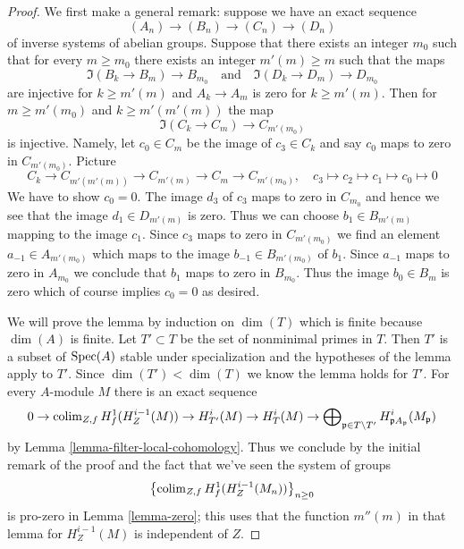 \begin{proof}
We first make a general remark: suppose we have an exact
sequence
$$
(A_n) \to (B_n) \to (C_n) \to (D_n)
$$
of inverse systems of abelian groups. Suppose that there exists
an integer $m_0$ such that for every $m \geq m_0$
there exists an integer $m'(m) \geq m$ such that the maps
$$
\Im(B_k \to B_m) \longrightarrow B_{m_0}
\quad\text{and}\quad
\Im(D_k \to D_m) \longrightarrow D_{m_0}
$$
are injective for $k \geq m'(m)$ and $A_k \to A_m$ is zero
for $k \geq m'(m)$. Then for $m \geq m'(m_0)$ and $k \geq m'(m'(m))$
the map
$$
\Im(C_k \to C_m) \to C_{m'(m_0)}
$$
is injective. Namely, let $c_0 \in C_m$ be the image of $c_3 \in C_k$
and say $c_0$ maps to zero in $C_{m'(m_0)}$. Picture
$$
C_k \to C_{m'(m'(m))} \to C_{m'(m)} \to C_m \to C_{m'(m_0)},\quad
c_3 \mapsto c_2 \mapsto c_1 \mapsto c_0 \mapsto 0
$$
We have to show $c_0 = 0$.
The image $d_3$ of $c_3$ maps to zero in $C_{m_0}$ and hence
we see that the image $d_1 \in D_{m'(m)}$ is zero.
Thus we can choose $b_1 \in B_{m'(m)}$ mapping to
the image $c_1$. Since $c_3$ maps to zero in
$C_{m'(m_0)}$ we find an element $a_{-1} \in A_{m'(m_0)}$
which maps to the image $b_{-1} \in B_{m'(m_0)}$ of $b_1$.
Since $a_{-1}$ maps to zero in $A_{m_0}$ we conclude that
$b_1$ maps to zero in $B_{m_0}$. Thus the image $b_0 \in B_m$
is zero which of course implies $c_0 = 0$ as desired.

\medskip\noindent
We will prove the lemma by induction on $\dim(T)$ which is
finite because $\dim(A)$ is finite. Let $T' \subset T$ be
the set of nonminimal primes in $T$. Then $T'$ is a subset
of $\mathop{\mathrm{Spec}}(A)$ stable under specialization and the hypotheses
of the lemma apply to $T'$. Since $\dim(T') < \dim(T)$ we know
the lemma holds for $T'$. For every $A$-module $M$ there is an
exact sequence
$$
0 \to \mathop{\mathrm{colim}}\nolimits_{Z, f} H^1_f(H^{i - 1}_Z(M)) \to
H^i_{T'}(M) \to H^i_T(M) \to
\bigoplus\nolimits_{\mathfrak p \in T \setminus T'}
H^i_{\mathfrak p A_\mathfrak p}(M_\mathfrak p)
$$
by Lemma \ref{lemma-filter-local-cohomology}.
Thus we conclude by the initial remark of the proof
and the fact that we've seen the system of groups
$$
\left\{\mathop{\mathrm{colim}}\nolimits_{Z, f} H^1_f(H^{i - 1}_Z(M_n))\right\}_{n \geq 0}
$$
is pro-zero in Lemma \ref{lemma-zero}; this uses that the function
$m''(m)$ in that lemma for $H^{i - 1}_Z(M)$ is independent of $Z$.
\end{proof}











